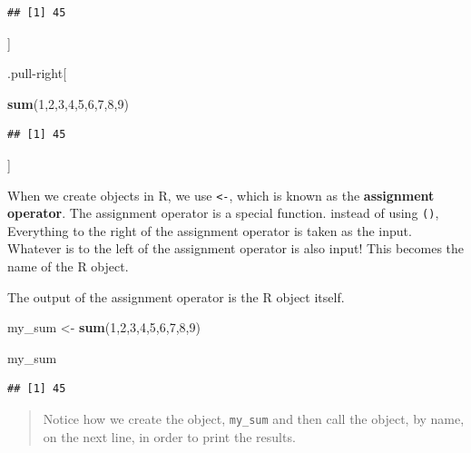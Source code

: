 \documentclass[
]{book}
\newenvironment{Shaded}{\begin{snugshade}}{\end{snugshade}}
\newcommand{\DecValTok}[1]{\textcolor[rgb]{0.00,0.00,0.81}{#1}}
\newcommand{\FunctionTok}[1]{\textcolor[rgb]{0.13,0.29,0.53}{\textbf{#1}}}
\newcommand{\NormalTok}[1]{#1}
\newcommand{\OtherTok}[1]{\textcolor[rgb]{0.56,0.35,0.01}{#1}}
\begin{document}
\begin{verbatim}
## [1] 45
\end{verbatim}

{]}

.pull-right{[}

\begin{Shaded}
\begin{Highlighting}[]
\FunctionTok{sum}\NormalTok{(}\DecValTok{1}\NormalTok{,}\DecValTok{2}\NormalTok{,}\DecValTok{3}\NormalTok{,}\DecValTok{4}\NormalTok{,}\DecValTok{5}\NormalTok{,}\DecValTok{6}\NormalTok{,}\DecValTok{7}\NormalTok{,}\DecValTok{8}\NormalTok{,}\DecValTok{9}\NormalTok{)}
\end{Highlighting}
\end{Shaded}

\begin{verbatim}
## [1] 45
\end{verbatim}

{]}

When we create objects in R, we use \texttt{\textless{}-}, which is known as the \textbf{assignment operator}. The assignment operator is a special function. instead of using \texttt{()}, Everything to the right of the assignment operator is taken as the input. Whatever is to the left of the assignment operator is also input! This becomes the name of the R object.

The output of the assignment operator is the R object itself.

\begin{Shaded}
\begin{Highlighting}[]
\NormalTok{my\_sum }\OtherTok{\textless{}{-}} \FunctionTok{sum}\NormalTok{(}\DecValTok{1}\NormalTok{,}\DecValTok{2}\NormalTok{,}\DecValTok{3}\NormalTok{,}\DecValTok{4}\NormalTok{,}\DecValTok{5}\NormalTok{,}\DecValTok{6}\NormalTok{,}\DecValTok{7}\NormalTok{,}\DecValTok{8}\NormalTok{,}\DecValTok{9}\NormalTok{)}

\NormalTok{my\_sum}
\end{Highlighting}
\end{Shaded}

\begin{verbatim}
## [1] 45
\end{verbatim}

\begin{quote}
Notice how we create the object, \texttt{my\_sum} and then call the object, by name,
on the next line, in order to print the results.
\end{quote}
\end{document}
